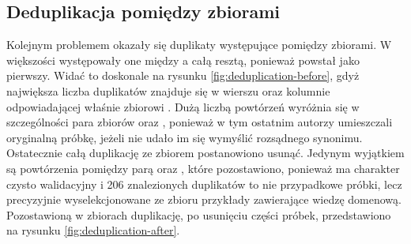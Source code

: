 \subsection{Deduplikacja pomiędzy zbiorami}
Kolejnym problemem okazały się duplikaty występujące pomiędzy zbiorami. W większości występowały one między  a całą resztą, ponieważ  powstał jako pierwszy. Widać to doskonale na rysunku \ref{fig:deduplication-before}, gdyż największa liczba duplikatów znajduje się w wierszu oraz kolumnie odpowiadającej właśnie zbiorowi . Dużą liczbą powtórzeń wyróżnia się w szczególności para zbiorów  oraz , ponieważ w tym ostatnim autorzy umieszczali oryginalną próbkę, jeżeli nie udało im się wymyślić rozsądnego synonimu. Ostatecznie całą duplikację ze zbiorem  postanowiono usunąć. Jedynym wyjątkiem są powtórzenia pomiędzy parą  oraz , które pozostawiono, ponieważ  ma charakter czysto walidacyjny i 206 znalezionych duplikatów to nie przypadkowe próbki, lecz precyzyjnie wyselekcjonowane ze zbioru  przykłady zawierające wiedzę domenową. Pozostawioną w zbiorach duplikację, po usunięciu części próbek, przedstawiono na rysunku \ref{fig:deduplication-after}. 

